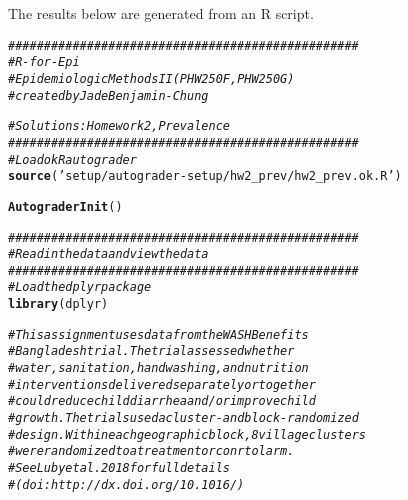 \documentclass{article}\usepackage[]{graphicx}\usepackage[]{color}
\makeatletter
\newcommand{\hlstr}[1]{\textcolor[rgb]{0.192,0.494,0.8}{#1}}%
\newcommand{\hlcom}[1]{\textcolor[rgb]{0.678,0.584,0.686}{\textit{#1}}}%
\newcommand{\hlstd}[1]{\textcolor[rgb]{0.345,0.345,0.345}{#1}}%
\newcommand{\hlkwd}[1]{\textcolor[rgb]{0.737,0.353,0.396}{\textbf{#1}}}%
\newenvironment{kframe}{%
 \def\at@end@of@kframe{}%
 \ifinner\ifhmode%
  \def\at@end@of@kframe{\end{minipage}}%
  \begin{minipage}{\columnwidth}%
 \fi\fi%
 \def\FrameCommand##1{\hskip\@totalleftmargin \hskip-\fboxsep
 \colorbox{shadecolor}{##1}\hskip-\fboxsep
     \hskip-\linewidth \hskip-\@totalleftmargin \hskip\columnwidth}%
 \MakeFramed {\advance\hsize-\width
   \@totalleftmargin\z@ \linewidth\hsize
   \@setminipage}}%
 {\par\unskip\endMakeFramed%
 \at@end@of@kframe}
\newenvironment{knitrout}{}{} %
\makeatother
\begin{document}
The results below are generated from an R script.

\begin{knitrout}
\color{fgcolor}\begin{kframe}
\begin{alltt}
\hlcom{#################################################}
\hlcom{# R-for-Epi}
\hlcom{# Epidemiologic Methods II (PHW250F, PHW250G)}
\hlcom{# created by Jade Benjamin-Chung}

\hlcom{# Solutions: Homework 2, Prevalence}
\hlcom{#################################################}
\hlcom{# Load okR autograder}
\hlkwd{source}\hlstd{(}\hlstr{'setup/autograder-setup/hw2_prev/hw2_prev.ok.R'}\hlstd{)}
\end{alltt}


{\ttfamily\noindent\itshape\color{messagecolor}{\#\# here() starts at /Users/Nolan/Desktop/grading-temp/hw-prev-trial copy}}

{\ttfamily\noindent\color{warningcolor}{\#\# Warning: package 'checkr' was built under R version 3.5.2}}

{\ttfamily\noindent\color{warningcolor}{\#\# Warning: package 'assertthat' was built under R version 3.5.2}}

{\ttfamily\noindent\color{warningcolor}{\#\# Warning: package 'dplyr' was built under R version 3.5.2}}

{\ttfamily\noindent\itshape\color{messagecolor}{\#\# \\\#\# Attaching package: 'dplyr'}}

{\ttfamily\noindent\itshape\color{messagecolor}{\#\# The following objects are masked from 'package:stats':\\\#\# \\\#\#\ \ \ \  filter, lag}}

{\ttfamily\noindent\itshape\color{messagecolor}{\#\# The following objects are masked from 'package:base':\\\#\# \\\#\#\ \ \ \  intersect, setdiff, setequal, union}}\begin{alltt}
\hlkwd{AutograderInit}\hlstd{()}

\hlcom{#################################################}
\hlcom{# Read in the data and view the data}
\hlcom{#################################################}
\hlcom{# Load the dplyr package}
\hlkwd{library}\hlstd{(dplyr)}

\hlcom{# This assignment uses data from the WASH Benefits}
\hlcom{# Bangladesh trial. The trial assessed whether }
\hlcom{# water, sanitation, handwashing, and nutrition }
\hlcom{# interventions delivered separately or together}
\hlcom{# could reduce child diarrhea and/or improve child}
\hlcom{# growth. The trials used a cluster- and block-randomized }
\hlcom{# design. Within each geographic block, 8 village clusters}
\hlcom{# were randomized to a treatment or conrtol arm. }
\hlcom{# See Luby et al. 2018 for full details }
\hlcom{# (doi: http://dx.doi.org/10.1016/)}


\end{alltt}
\end{kframe}
\end{knitrout}
\end{document}
